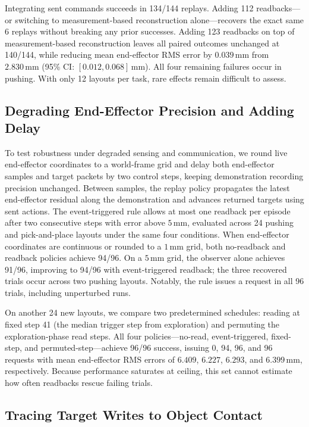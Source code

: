Integrating sent commands succeeds in 134/144 replays. Adding 112 readbacks---or switching to measurement-based reconstruction alone---recovers the exact same 6 replays without breaking any prior successes. Adding 123 readbacks on top of measurement-based reconstruction leaves all paired outcomes unchanged at 140/144, while reducing mean end-effector RMS error by $0.039\,\text{mm}$ from $2.830\,\text{mm}$ (95\% CI: $[0.012, 0.068]\,\text{mm}$). All four remaining failures occur in pushing. With only 12 layouts per task, rare effects remain difficult to assess.

\subsection{Degrading End-Effector Precision and Adding Delay}

To test robustness under degraded sensing and communication, we round live end-effector coordinates to a world-frame grid and delay both end-effector samples and target packets by two control steps, keeping demonstration recording precision unchanged. Between samples, the replay policy propagates the latest end-effector residual along the demonstration and advances returned targets using sent actions. The event-triggered rule allows at most one readback per episode after two consecutive steps with error above $5\,\text{mm}$, evaluated across 24 pushing and pick-and-place layouts under the same four conditions. When end-effector coordinates are continuous or rounded to a $1\,\text{mm}$ grid, both no-readback and readback policies achieve 94/96. On a $5\,\text{mm}$ grid, the observer alone achieves 91/96, improving to 94/96 with event-triggered readback; the three recovered trials occur across two pushing layouts. Notably, the rule issues a request in all 96 trials, including unperturbed runs.

On another 24 new layouts, we compare two predetermined schedules: reading at fixed step 41 (the median trigger step from exploration) and permuting the exploration-phase read steps. All four policies---no-read, event-triggered, fixed-step, and permuted-step---achieve 96/96 success, issuing 0, 94, 96, and 96 requests with mean end-effector RMS errors of $6.409$, $6.227$, $6.293$, and $6.399\,\text{mm}$, respectively. Because performance saturates at ceiling, this set cannot estimate how often readbacks rescue failing trials.

\subsection{Tracing Target Writes to Object Contact}

